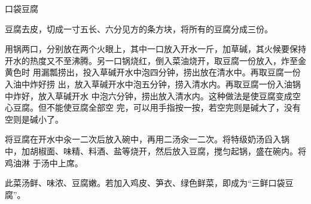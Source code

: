 %
%
%
%
%
%
%
\begin{recipe}{口袋豆腐}

\ingredients


\preparation

\step 豆腐去皮，切成一寸五长、六分见方的条方块，将所有的豆腐分成三份。

\step 用锅两口，分别放在两个火眼上，其中一口放入开水一斤，加草碱，其火候要保持
开水的热度又不至沸腾。另一口锅烧红，倒入菜油烧开，取豆腐一份放入，炸至金黄色时
用漏瓢捞出，投入草碱开水中泡四分钟，捞出放在清水中。再取豆腐一份入油中炸好捞
出，放入草碱开水中泡五分钟，捞入清水内。再取豆腐一份入油锅中炸好，放入草碱开水
中泡六分钟，捞出放入清水内。这种做法是使豆腐变成空心豆腐。但不能使豆腐全部空
完，可以用手指按一按，若空完则是碱大了，没有空则是碱小了。

\step 将豆腐在开水中汆一二次后放入碗中，再用二汤汆一二次。将特级奶汤舀入锅
中，加胡椒面、味精、料酒、盐等烧开，然后放入豆腐，搅匀起锅，盛在碗内。将鸡油淋
于汤中上席。

\features

此菜汤鲜、味浓、豆腐嫩。若加入鸡皮、笋衣、绿色鲜菜，即成为“三鲜口袋豆腐”。

\end{recipe}

